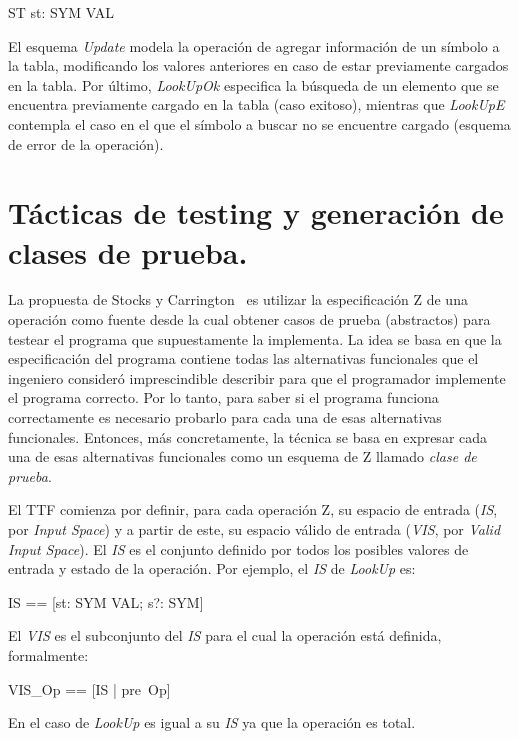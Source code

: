 \begin{schema}{ST}
st: SYM \pfun VAL
\end{schema}

El esquema \emph{Update} modela la operación de agregar información de un símbolo a la tabla, modificando los valores anteriores en caso de estar previamente cargados en la tabla.
Por último, \emph{LookUpOk} especifica la búsqueda de un elemento que se encuentra previamente cargado en la tabla (caso exitoso), mientras que \emph{LookUpE} contempla el caso en el que el símbolo a buscar no se encuentre cargado (esquema de error de la operación).


\section{Tácticas de testing y generación de clases de prueba.}

La propuesta de Stocks y Carrington~\cite{stocks} es utilizar la especificación Z de una operación como fuente desde la cual obtener casos de prueba (abstractos) para testear el programa que supuestamente la implementa. La idea se basa en que la especificación del programa contiene todas las alternativas funcionales que el ingeniero consideró imprescindible describir para que el programador implemente el programa correcto. Por lo tanto, para saber si el programa funciona correctamente es necesario probarlo para cada una de esas alternativas funcionales. Entonces, más concretamente, la técnica se basa en expresar cada una de esas alternativas funcionales como un esquema de Z llamado \emph{clase de prueba}.


El TTF comienza por definir, para cada operación Z, su espacio de entrada (\emph{IS}, por \emph{Input Space}) y a partir de este, su espacio válido de entrada (\emph{VIS}, por \emph{Valid Input Space}). El \emph{IS} es el conjunto definido por todos los posibles valores de entrada y estado de la operación. Por ejemplo, el \emph{IS} de \emph{LookUp} es:

\begin{zed}
  IS == [st: SYM \pfun VAL; s?: SYM]
\end{zed}

El \emph{VIS} es el subconjunto del \emph{IS} para el cual la operación está definida, formalmente:

\begin{zed}
  VIS_{Op} == [IS | pre~Op]
\end{zed}

En el caso de \emph{LookUp} es igual a su \emph{IS} ya que la operación es total. 

